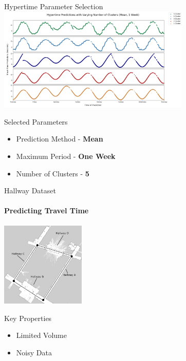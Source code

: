 \documentclass{beamer}
\begin{document}
\begin{frame}[t]{Hypertime Parameter Selection}
    \centering
    \vspace*{-0.25cm}
    {\includegraphics[width = 3.6in]{images/varying_clusters.png}}
    \vspace*{-0.45cm}

  \begin{block}{Selected Parameters}
    \begin{itemize}
      \item Prediction Method - \textbf{Mean}
      \item Maximum Period - \textbf{One Week}
      \item Number of Clusters - \textbf{5}
    \end{itemize}
  \end{block}

\end{frame}



\begin{frame}[t]{Hallway Dataset}
  \framesubtitle{Predicting Travel Time}
  \centering
  \includegraphics[width=4.0cm]{images/ROPOD_nodes.png}

  \begin{block}{Key Properties}
    \begin{itemize}
      \item Limited Volume
      \item Noisy Data
    \end{itemize}
  \end{block}

\end{frame}
\end{document}
